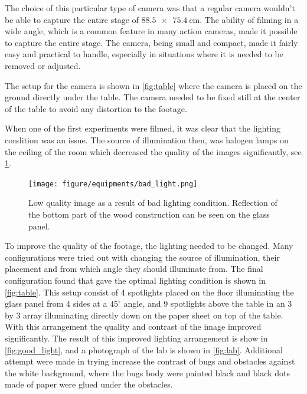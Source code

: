The choice of this particular type of camera was that a regular camera wouldn't be able to capture the 
entire stage of $\SI[product-units = single]{88.5 x 75.4}{\centi\metre}$. 
The ability of filming in a wide angle, which is a common feature in many action cameras, 
made it possible to capture the entire stage. The camera, being small and compact, made it fairly easy and practical 
to handle, especially in situations where it is needed to be removed or adjusted. 

The setup for the camera is shown in \cref{fig:table} where the camera is placed on the ground directly under the 
table. The camera needed to be fixed still at the center of the table to avoid any distortion to the footage. 

When one of the first experiments were filmed, it was clear that the lighting condition was an issue. 
The source of illumination then, was halogen lamps on the ceiling of the room which decreased the quality 
of the images significantly, see \cref{fig:bad_light}. 

\begin{figure}[htpb!]
    \centering
    \texttt{[image: figure/equipments/bad\_light.png]}
    \caption{Low quality image as a result of bad lighting condition. Reflection of the bottom part of the wood 
    construction can be seen on the glass panel.}
    \label{fig:bad_light}
\end{figure}

To improve the quality of the footage, the lighting needed to be changed. Many configurations were tried 
out with changing the source of illumination, their placement and from which angle they should illuminate from. 
The final configuration found that gave the optimal lighting condition is shown in \cref{fig:table}. 
This setup consist of 4 spotlights placed on the floor illuminating the glass panel from 4 sides at a 
$45^{\circ}$ angle, and 9 spotlights above the table in an 3 by 3 array illuminating directly down on the 
paper sheet on top of the table. With this arrangement the quality and contrast of the image improved significantly. 
The result of this improved lighting arrangement is show in \cref{fig:good_light}, and a photograph of the lab is shown in \cref{fig:lab}.
Additional attempt were made in trying increase the contrast of bugs and obstacles against the white background, where 
the bugs body were painted black and black dots made of paper were glued under the obstacles. 

